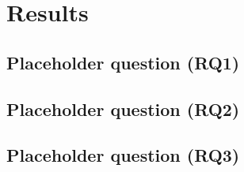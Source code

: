 \chapter{Results\label{results}}
\section{Placeholder question (RQ1)}
\section{Placeholder question (RQ2)}
\section{Placeholder question (RQ3)}